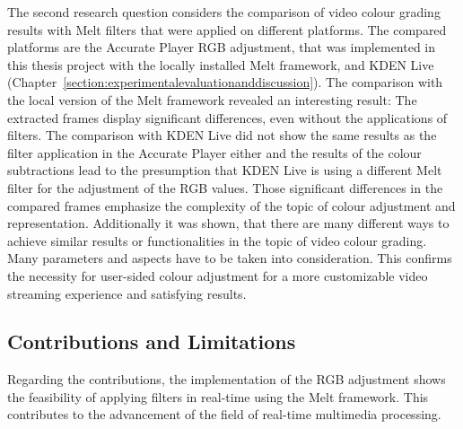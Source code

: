\documentclass[../MasterThesis.tex]{subfiles}
\begin{document}
The second research question considers the comparison of video colour grading results with Melt filters that were applied on different platforms. The compared platforms are the Accurate Player RGB adjustment, that was implemented in this thesis project with the locally installed Melt framework, and KDEN Live (Chapter~\ref{section:experimentalevaluationanddiscussion}).
%
%
The comparison with the local version of the Melt framework revealed an interesting result: The extracted frames display significant differences, even without the applications of filters. 
The comparison with KDEN Live did not show the same results as the filter application in the Accurate Player either and the results of the colour subtractions lead to the presumption that KDEN Live is using a different Melt filter for the adjustment of the RGB values.
%
Those significant differences in the compared frames emphasize the complexity of the topic of colour adjustment and representation. 
%
%
Additionally it was shown, that there are many different ways to achieve similar results or functionalities in the topic of video colour grading. Many parameters and aspects have to be taken into consideration. This confirms the necessity for user-sided colour adjustment for a more customizable video streaming experience and satisfying results. 





\subsection{Contributions and Limitations} \label{subsection:contributionslimitations}



Regarding the contributions, the implementation of the RGB adjustment shows the feasibility of applying filters in real-time using the Melt framework.
This contributes to the advancement of the field of real-time multimedia processing.
\end{document}
